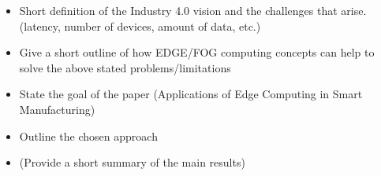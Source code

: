 \begin{itemize}
\item Short definition of the Industry 4.0 vision and the challenges that arise. (latency, number of devices, amount of data, etc.)
\item Give a short outline of how EDGE/FOG computing concepts can help to solve the above stated problems/limitations
\item State the goal of the paper (Applications of Edge Computing in Smart Manufacturing)
\item Outline the chosen approach
\item (Provide a short summary of the main results)
\end{itemize}